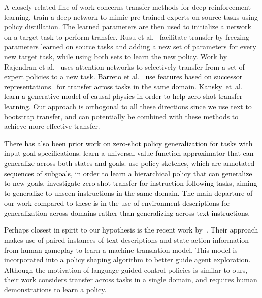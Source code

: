 
A closely related line of work concerns transfer methods for deep reinforcement learning.   train a deep network to mimic pre-trained experts on source tasks using policy distillation. The learned parameters are then used to initialize a network on a target task to perform transfer. Rusu et al.~\citeyear{rusu2016progressive} facilitate transfer by freezing parameters learned on source tasks and adding a new set of parameters for every new target task, while using both sets to learn the new policy. Work by Rajendran et al.~\citeyear{rajendran20172t} uses attention networks to selectively transfer from a set of expert policies to a new task. \textcolor{black}{Barreto et al.~\citeyear{barreto2017successor} use features based on successor representations~ for transfer across tasks in the same domain. Kansky~et~al.~\citeyear{kansky2017schema} learn a generative model of causal physics in order to help zero-shot transfer learning.} Our approach is orthogonal to all these directions since we use text to bootstrap transfer, and can potentially be combined with these methods to achieve more effective transfer. 

\textcolor{black}{There has also been prior work on zero-shot policy generalization for tasks with input goal specifications.  learn a universal value function approximator that can generalize across both states and goals.  use policy sketches, which are annotated sequences of subgoals, in order to learn a hierarchical policy that can generalize to new goals.  investigate zero-shot transfer for instruction following tasks, aiming to generalize to unseen instructions in the same domain. The main departure of our work compared to these is in the use of environment descriptions for generalization across domains rather than generalizing across text instructions.}

Perhaps closest in spirit to our hypothesis is the recent work by~. Their approach makes use of paired instances of text descriptions and state-action information from human gameplay to learn a machine translation model. This model is incorporated into a policy shaping algorithm to better guide agent exploration. Although the motivation of language-guided control policies is similar to ours, their work considers transfer across tasks in a single domain, and requires human demonstrations to learn a policy.

